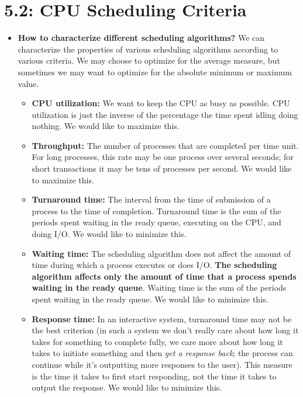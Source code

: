 \documentclass[12pt]{article}
\begin{document}
\section*{5.2: CPU Scheduling Criteria}

\begin{itemize}
    \item \textbf{How to characterize different scheduling algorithms?} We can characterize the properties of various scheduling algorithms according to various criteria. We may choose to optimize for the average measure, but sometimes we may want to optimize for the absolute minimum or maximum value.
        \begin{itemize}
            \item \textbf{CPU utilization:} We want to keep the CPU as busy as possible. CPU utilization is just the inverse of the percentage the time spent idling doing nothing. We would like to maximize this.
            \item \textbf{Throughput:} The number of processes that are completed per time unit. For long processes, this rate may be one process over several seconds; for short transactions it may be tens of processes per second. We would like to maximize this.
            \item \textbf{Turnaround time:} The interval from the time of submission of a process to the time of completion. Turnaround time is the sum of the periods spent waiting in the ready queue, executing on the CPU, and doing I/O. We would like to minimize this.
            \item \textbf{Waiting time:} The scheduling algorithm does not affect the amount of time during which a process executes or does I/O. \textbf{The scheduling algorithm affects only the amount of time that a process spends waiting in the ready queue}. Waiting time is the sum of the periods spent waiting in the ready queue. We would like to minimize this.
            \item \textbf{Response time:} In an interactive system, turnaround time may not be the best criterion (in such a system we don't really care about how long it takes for something to complete fully, we care more about how long it takes to initiate something and then \textit{get a response back}; the process can continue while it's outputting more responses to the user). This measure is the time it takes to first start responding, not the time it takes to output the response. We would like to minimize this.
        \end{itemize}
\end{itemize}
\end{document}
